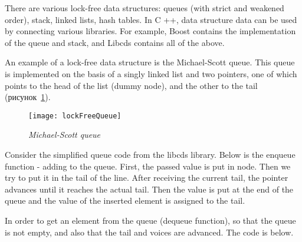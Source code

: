 {\begin{itemize}
	\end{itemize}
	\par There are various lock-free data structures: queues (with strict and weakened order), stack, linked lists, hash tables. In C ++, data structure data can be used by connecting various libraries. For example, Boost contains the implementation of the queue and stack, and Libcds contains all of the above.
	\par An example of a lock-free data structure is the Michael-Scott queue. This queue is implemented on the basis of a singly linked list and two pointers, one of which points to the head of the list (dummy node), and the other to the tail (рисунок~\ref{lockFreeQueue:image}).
	\begin{figure}[H]
		\texttt{[image: lockFreeQueue]}
		\caption{\textit{Michael-Scott queue}}
		\label{lockFreeQueue:image}
	\end{figure}
	\par Consider the simplified queue code from the libcds library. Below is the enqueue function - adding to the queue. First, the passed value is put in node. Then we try to put it in the tail of the line. After receiving the current tail, the pointer advances until it reaches the actual tail. Then the value is put at the end of the queue and the value of the inserted element is assigned to the tail.
	\begin{figure}[H]
		
	\end{figure}
	\par In order to get an element from the queue (dequeue function), so that the queue is not empty, and also that the tail and voices are advanced. The code is below.
	\begin{figure}[H]
		
	\end{figure}
}